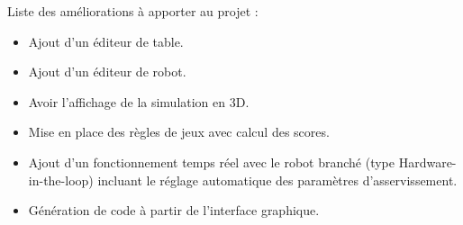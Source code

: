 





Liste des améliorations à apporter au projet :
\begin{itemize}
	\item{Ajout d'un éditeur de table.}
	\item{Ajout d'un éditeur de robot.}
	\item{Avoir l'affichage de la simulation en 3D.}
	\item{Mise en place des règles de jeux avec calcul des scores.}		
	\item{Ajout d'un fonctionnement temps réel avec le robot branché (type Hardware-in-the-loop) incluant le réglage automatique des paramètres d'asservissement.}
	\item{Génération de code à partir de l'interface graphique.}
\end{itemize}

